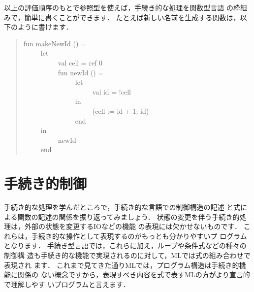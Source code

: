 \documentclass{jbook}
\newcommand{\myem}{\ \ \ \ \  }
\begin{document}
	以上の評価順序のもとで参照型を使えば，手続き的な処理を関数型言語
の枠組みで，簡単に書くことができます．
	たとえば新しい名前を生成する関数は，以下のように書けます．
\begin{tt}
\begin{quote}
fun makeNewId () =\\
\myem let\\
\myem\myem val cell = ref 0\\
\myem\myem fun newId () =\\
\myem\myem\myem let\\
\myem\myem\myem\myem val id = !cell\\
\myem\myem\myem in\\
\myem\myem\myem\myem (cell := id + 1; id)\\
\myem\myem\myem end\\
\myem in\\
\myem\myem newId\\
\myem end
\end{quote}
\end{tt}
	
\section{手続き的制御}
\label{sec:tutorialValueRestriction}

	手続き的な処理を学んだところで，手続き的な言語での制御構造の記述
と式による関数の記述の関係を振り返ってみましょう．
	状態の変更を伴う手続き的処理は，外部の状態を変更するIOなどの機能
の表現には欠かせないものです．
	これらは，手続き的な操作として表現するのがもっとも分かりやすいプ
ログラムとなります．
	手続き型言語では，これらに加え，ループや条件式などの種々の制御構
造も手続き的な機能で実現されるのに対して，MLでは式の組み合わせで表現され
ます．
	これまで見てきた通りMLでは，プログラム構造は手続き的機能に関係の
ない概念ですから，表現すべき内容を式で表すMLの方がより宣言的で理解しやす
いプログラムと言えます．
\end{document}
